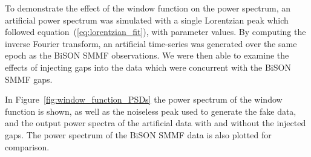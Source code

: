 To demonstrate the effect of the window function on the power spectrum, an artificial power spectrum was simulated with a single Lorentzian peak which followed equation~(\ref{eq:lorentzian_fit}), with parameter values. By computing the inverse Fourier transform, an artificial time-series was generated over the same epoch as the BiSON SMMF observations. We were then able to examine the effects of injecting gaps into the data which were concurrent with the BiSON SMMF gaps. 

In Figure~\ref{fig:window_function_PSDs} the power spectrum of the window function is shown, as well as the noiseless peak used to generate the fake data, and the output power spectra of the artificial data with and without the injected gaps. The power spectrum of the BiSON SMMF data is also plotted for comparison.



